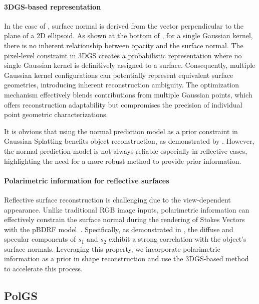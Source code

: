 \vspace{-1em}
\paragraph{3DGS-based representation}
In the case of \gs, surface normal is derived from the vector perpendicular to the plane of a 2D ellipsoid. As shown at the bottom of , for a single Gaussian kernel, there is no inherent relationship between opacity and the surface normal. 
The pixel-level constraint in 3DGS creates a probabilistic representation where no single Gaussian kernel is definitively assigned to a surface. Consequently, multiple Gaussian kernel configurations can potentially represent equivalent surface geometries, introducing inherent reconstruction ambiguity. 
The optimization mechanism effectively blends contributions from multiple Gaussian points, which offers reconstruction adaptability but compromises the precision of individual point geometric characterizations.

It is obvious that using the normal prediction model as a prior constraint in Gaussian Splatting benefits object reconstruction, as demonstrated by \gs. However, the normal prediction model is not always reliable especially in reflective cases, highlighting the need for a more robust method to provide prior information.
\vspace{-1em}
\paragraph{Polarimetric information for reflective surfaces}
Reflective surface reconstruction is challenging due to the view-dependent appearance. Unlike traditional RGB image inputs, 
polarimetric information can effectively constrain the surface normal during the rendering of Stokes Vectors with the pBDRF model~\cite{baek2018simultaneous}.
 Specifically, as demonstrated in , the diffuse and specular components of $s_1$ and $s_2$ 
exhibit a strong correlation with the object's surface normals. Leveraging this property, we incorporate polarimetric information as a prior in shape reconstruction and use the 3DGS-based method to accelerate this process.




\subsection{PolGS}
